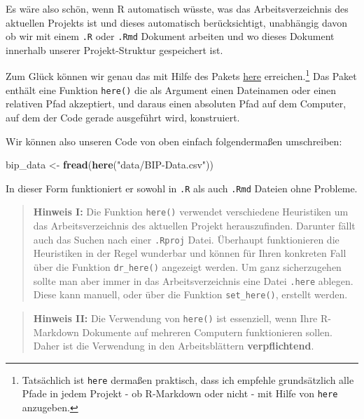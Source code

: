 \documentclass[]{book}
\newenvironment{Shaded}{\begin{snugshade}}{\end{snugshade}}
\newcommand{\KeywordTok}[1]{\textcolor[rgb]{0.13,0.29,0.53}{\textbf{#1}}}
\newcommand{\StringTok}[1]{\textcolor[rgb]{0.31,0.60,0.02}{#1}}
\newcommand{\NormalTok}[1]{#1}
\let\rmarkdownfootnote\footnote%
\def\footnote{\protect\rmarkdownfootnote}
\begin{document}
Es wäre also schön, wenn R automatisch wüsste, was das
Arbeitsverzeichnis des aktuellen Projekts ist und dieses automatisch
berücksichtigt, unabhängig davon ob wir mit einem \texttt{.R} oder
\texttt{.Rmd} Dokument arbeiten und wo dieses Dokument innerhalb unserer
Projekt-Struktur gespeichert ist.

Zum Glück können wir genau das mit Hilfe des Pakets
\href{https://github.com/jennybc/here_here}{here} erreichen.\footnote{Tatsächlich
  ist \texttt{here} dermaßen praktisch, dass ich empfehle grundsätzlich
  alle Pfade in jedem Projekt - ob R-Markdown oder nicht - mit Hilfe von
  \texttt{here} anzugeben.} Das Paket enthält eine Funktion
\texttt{here()} die als Argument einen Dateinamen oder einen relativen
Pfad akzeptiert, und daraus einen absoluten Pfad auf dem Computer, auf
dem der Code gerade ausgeführt wird, konstruiert.

Wir können also unseren Code von oben einfach folgendermaßen
umschreiben:

\begin{Shaded}
\begin{Highlighting}[]
\NormalTok{bip_data <-}\StringTok{ }\KeywordTok{fread}\NormalTok{(}\KeywordTok{here}\NormalTok{(}\StringTok{"data/BIP-Data.csv"}\NormalTok{))}
\end{Highlighting}
\end{Shaded}

In dieser Form funktioniert er sowohl in \texttt{.R} als auch
\texttt{.Rmd} Dateien ohne Probleme.

\begin{quote}
\textbf{Hinweis I:} Die Funktion \texttt{here()} verwendet verschiedene
Heuristiken um das Arbeitsverzeichnis des aktuellen Projekt
herauszufinden. Darunter fällt auch das Suchen nach einer
\texttt{.Rproj} Datei. Überhaupt funktionieren die Heuristiken in der
Regel wunderbar und können für Ihren konkreten Fall über die Funktion
\texttt{dr\_here()} angezeigt werden. Um ganz sicherzugehen sollte man
aber immer in das Arbeitsverzeichnis eine Datei \texttt{.here} ablegen.
Diese kann manuell, oder über die Funktion \texttt{set\_here()},
erstellt werden.
\end{quote}

\begin{quote}
\textbf{Hinweis II:} Die Verwendung von \texttt{here()} ist essenziell,
wenn Ihre R-Markdown Dokumente auf mehreren Computern funktionieren
sollen. Daher ist die Verwendung in den Arbeitsblättern
\textbf{verpflichtend}.
\end{quote}
\end{document}
